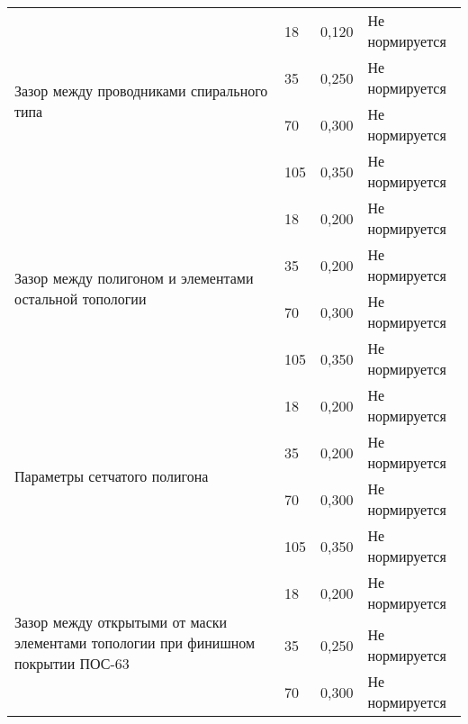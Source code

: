 \begin{longtable}{|p{5cm}|p{2cm}|p{3cm}|p{4cm}|}
\multirow{4}{5cm}{Зазор между проводниками спирального типа} & 18                     & 0,120                      & Не нормируется \\ \cline{2-4}
                                   & 35                            & 0,250                        & Не нормируется \\ \cline{2-4}
                                   & 70                            & 0,300                        & Не нормируется \\ \cline{2-4}
                                   & 105                           & 0,350                       & Не нормируется \\ \hline
\multirow{4}{5cm}{Зазор между полигоном и элементами остальной топологии}& 18                     & 0,200                      & Не нормируется \\ \cline{2-4}
                                   & 35                            & 0,200                        & Не нормируется \\ \cline{2-4}
                                   & 70                            & 0,300                        & Не нормируется \\ \cline{2-4}
                                   & 105                           & 0,350                       & Не нормируется \\ \hline
\multirow{4}{5cm}{Параметры сетчатого полигона} & 18                     & 0,200                      & Не нормируется \\ \cline{2-4} 
                                   & 35                            & 0,200                        & Не нормируется \\ \cline{2-4}
                                   & 70                            & 0,300                        & Не нормируется \\ \cline{2-4}
                                   & 105                           & 0,350                       & Не нормируется \\ \hline
\multirow{4}{5cm}{Зазор между открытыми от маски элементами топологии при финишном покрытии ПОС-63} & 18                     & 0,200                      & Не нормируется \\
& & & \\ \cline{2-4}
                                   & 35                            & 0,250                        & Не нормируется \\ \cline{2-4}
                                   & 70                            & 0,300                        & Не нормируется \\ \cline{2-4}

\end{longtable}
